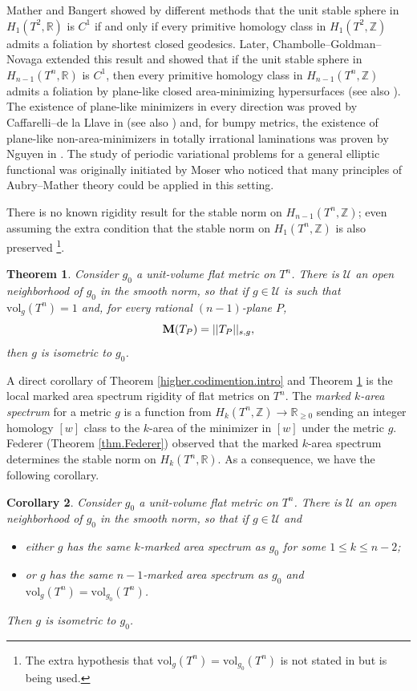 \documentclass[11pt]{amsart}
\def\R{\mathbb R}
\def\Z{\mathbb Z}
\def\vol{\mathrm{vol}}
\newtheorem{thm}{Theorem}[section]
\newtheorem{cor}[thm]{Corollary}
\theoremstyle{remark}
\theoremstyle{definition}
\begin{document}
	{Mather \cite{mather} and Bangert \cite{bangert} showed by different methods that  the unit stable sphere in $H_1(T^2,\R)$ is $C^1$ if and only if every primitive homology class in $H_1(T^2,\Z)$ admits a foliation by shortest closed geodesics. Later, Chambolle--Goldman--Novaga \cite{cgn} extended this result and showed that if the unit stable sphere in $H_{n-1}(T^n,\R)$ is $C^1$, then every primitive homology class in $H_{n-1}(T^n,\Z)$ admits a foliation by plane-like closed area-minimizing hypersurfaces (see also \cite{auer-bangert}). The existence of plane-like minimizers in every direction was proved by Caffarelli--de la Llave in \cite{caffarelli-lalave} (see also \cite{bangert-laminations}) and, for bumpy metrics, the existence of plane-like non-area-minimizers in totally irrational laminations was proven by Nguyen in \cite{Nguyen26}.  The study of periodic variational problems for a general elliptic functional was originally initiated by Moser \cite{moser} who noticed that many principles of Aubry--Mather theory could be applied in this setting.} 
	
	
	
	There is no known rigidity result for the stable norm on $H_{n-1}(T^n,\Z)$; {even assuming the extra condition that  the stable norm on $H_{1}(T^n,\Z)$ is also preserved} \footnote{The extra hypothesis that $\vol_g(T^n)=\vol_{g_0}(T^n)$ is not stated in \cite[Theorem 1]{osuna} but is being used.}. 
	
	\begin{thm}\label{codimension.one.intro}
		Consider $g_0$ a unit-volume flat metric on $T^n$. There is $\mathcal U$ an  open neighborhood of $g_0$ in the smooth norm, so that if $g\in \mathcal U$ is such that $\vol_g(T^n)=1$ and, for every rational $(n-1)$-plane $P$,
		$$
		{{\bf M}(T_P)=||T_P||_{s,g}},
		$$
		then $g$ is isometric to $g_0$.
	\end{thm}
	{
		A direct corollary of Theorem \ref{higher.codimention.intro} and Theorem \ref{codimension.one.intro} is the local marked area spectrum rigidity of flat metrics on $T^n$. The \emph{marked $k$-area spectrum} for a metric $g$ is a function from $H_k(T^n,\Z)\to \R_{\geq0}$ sending an integer homology $[w]$ class to the $k$-area of the minimizer in $[w]$ under the metric $g$. Federer (Theorem \ref{thm.Federer}) observed that the marked $k$-area spectrum determines the stable norm on $H_k(T^n,\R)$. As a consequence, we have the following corollary.
		\begin{cor}
			Consider $g_0$ a unit-volume flat metric on $T^n$. There is $\mathcal U$ an open neighborhood of $g_0$ in the smooth norm, so that if $g\in \mathcal U$ and
			\begin{itemize}
				\item either $g$ has the same $k$-marked area spectrum as $g_0$ for some $1\leq k\leq n-2$;
				\item or $g$ has the same $n-1$-marked area spectrum as $g_0$ and $\vol_g(T^n)=\vol_{g_0}(T^n)$.
			\end{itemize}
			Then $g$ is isometric to $g_0$.    
		\end{cor}
	}
	
\end{document}
